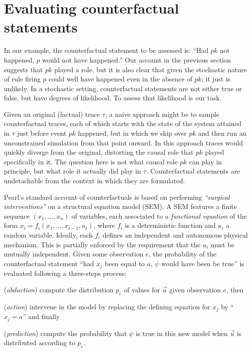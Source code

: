 
\newcommand{\PCFST}[0]{\ProbParen{\CFST{}}}

\newcommand{\ItAbduction}[0]{(\textit{abduction})}
\newcommand{\ItAction}[0]{(\textit{action})}
\newcommand{\ItPrediction}[0]{(\textit{prediction})}


\section{Evaluating counterfactual
  statements}\label{sec:counterfactual}

In our example, the counterfactual statement to be
assessed is: ``Had $pk$ not happened, $p$ would not have happened."
Our account in the previous section suggests that $pk$ played a role,
but it is also clear that given the stochastic nature of rule firing
$p$ could well have happened even in the absence of $pk$; it just is
unlikely. In a stochastic setting, counterfactual statements are not
either true or false, but have degrees of likelihood. To assess that
likelihood is our task.

Given an original (factual) trace $\tau$, a naive approach might be to sample
counterfactual traces, each of which starts with the state of the system
attained in $\tau$ just before event $pk$ happened, but in which we skip over
$pk$ and then run an unconstrained simulation from that point onward. In this
approach traces would quickly diverge from the original, distorting the causal
role that $pk$ played specifically in it. The question here is not what causal
role $pk$ can play in principle, but what role it actually did play in $\tau$.
Counterfactual statements are undetachable from the context in which they are
formulated.

Pearl's standard account of counterfactuals \cite{pearl2009causality}
is based on performing \textit{``surgical interventions''} on a
structural equation model (SEM). A SEM features a finite sequence
$(x_1, \dots, x_n)$ of variables, each associated to a
\emph{functional equation} of the form
$x_i = f_i(x_1, \dots, x_{i-1}, u_i)$, where $f_i$ is a deterministic
function and $u_i$ a random variable. Ideally, each $f_i$ defines an
independent and autonomous physical mechanism. This is partially
enforced by the requirement that the $u_i$ must be mutually
independent. Given some observation $e$, the probability of the
counterfactual statement ``had $x_j$ been equal to $a$, $\psi$ would
have been be true'' is evaluated following a three-steps process:
\begin{inparaenum}[]
\item \ItAbduction{} compute the distribution $p_e$ of values for
  $\vec u$ given observation $e$, then
\item \ItAction{} intervene in the model by replacing the defining
  equation for $x_j$ by ``$x_j = a$'' and finally
\item \ItPrediction{} compute the probability that $\psi$ is true in
  this new model when $\vec{u}$ is distributed according to $p_e$.
\end{inparaenum}

